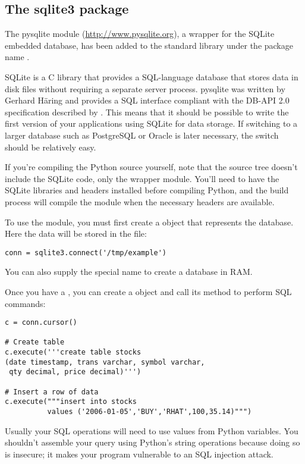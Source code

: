 \documentclass{howto}
\begin{document}
\subsection{The sqlite3 package\label{module-sqlite}}

The pysqlite module (\url{http://www.pysqlite.org}), a wrapper for the
SQLite embedded database, has been added to the standard library under
the package name .  

SQLite is a C library that provides a SQL-language database that
stores data in disk files without requiring a separate server process.
pysqlite was written by Gerhard H\"aring and provides a SQL interface
compliant with the DB-API 2.0 specification described by
. This means that it should be possible to write the first
version of your applications using SQLite for data storage.  If
switching to a larger database such as PostgreSQL or Oracle is
later necessary, the switch should be relatively easy.

If you're compiling the Python source yourself, note that the source
tree doesn't include the SQLite code, only the wrapper module.
You'll need to have the SQLite libraries and headers installed before
compiling Python, and the build process will compile the module when
the necessary headers are available.

To use the module, you must first create a  object
that represents the database.  Here the data will be stored in the 
 file:

\begin{verbatim}
conn = sqlite3.connect('/tmp/example')
\end{verbatim}

You can also supply the special name  to create
a database in RAM.

Once you have a , you can create a  
object and call its  method to perform SQL commands:

\begin{verbatim}
c = conn.cursor()

# Create table
c.execute('''create table stocks
(date timestamp, trans varchar, symbol varchar,
 qty decimal, price decimal)''')

# Insert a row of data
c.execute("""insert into stocks
          values ('2006-01-05','BUY','RHAT',100,35.14)""")
\end{verbatim}    

Usually your SQL operations will need to use values from Python
variables.  You shouldn't assemble your query using Python's string
operations because doing so is insecure; it makes your program
vulnerable to an SQL injection attack.  
\end{document}
